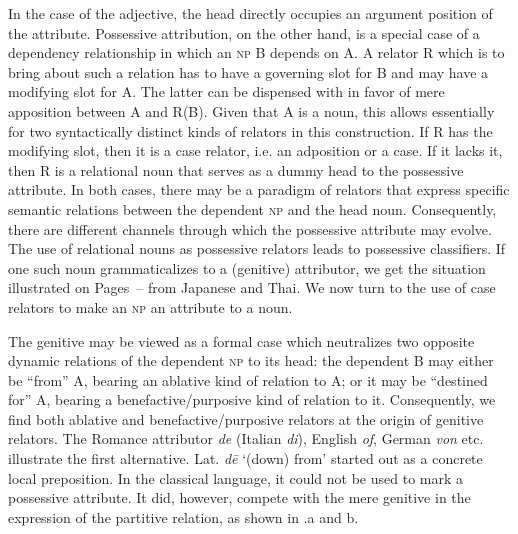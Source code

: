 In the case of the adjective, the head directly occupies an argument position of the attribute. Possessive attribution, on the other hand, is a special case of a dependency relationship in which an \textsc{np} B depends on A.\label{page78} A relator R which is to bring about such a relation has to have a governing slot for B and may have a modifying slot for A. The latter can be dispensed with in favor of mere apposition between A and R(B). Given that A is a noun, this allows essentially for two syntactically distinct kinds of relators in this construction. If R has the modifying slot, then it is a case relator, i.e. an adposition or a case. If it lacks it, then R is a relational noun that serves as a dummy head to the possessive attribute. In both cases, there may be a paradigm of relators that express specific semantic relations between the dependent \textsc{np} and the head noun. Consequently, there are different channels through which the possessive attribute may evolve. The use of relational nouns as possessive relators leads to possessive classifiers. If one such noun grammaticalizes to a (genitive) attributor, we get the situation illustrated on Pages~\pageref{page74b}--\pageref{page75}\chk%
  from Japanese and Thai. We now turn to the use of case relators to make an \textsc{np} an attribute to a noun.

The genitive may be viewed as a formal case which neutralizes two opposite dynamic relations of the dependent \textsc{np} to its head: the dependent B may either be “from” A, bearing an ablative kind of relation to A; or it may be “destined for” A, bearing a benefactive/purposive kind of relation to it. Consequently, we find both ablative and benefactive/purposive relators at the origin of genitive relators.\label{page78b} The Romance attributor \textit{de} (Italian \textit{di}), English \textit{of}, German \textit{von} etc. illustrate the first alternative. Lat. \textit{d\=e} ‘(down) from’ started out as a concrete local preposition. In the classical language, it could not be used to mark a possessive attribute. It did, however, compete with the mere genitive in the expression of the partitive relation, as shown in .a and b.


